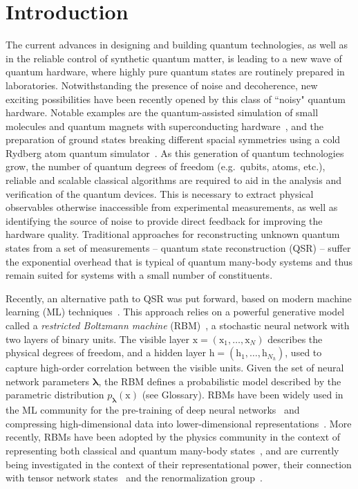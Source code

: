 \documentclass[submission, Phys, hidelnks]{SciPost}
\begin{document}
\section{Introduction}
The current advances in designing and building quantum technologies, as well as in the reliable control of synthetic quantum matter, is leading to a new wave of quantum hardware, where highly pure quantum states are routinely prepared in laboratories. Notwithstanding the presence of noise and decoherence, new exciting possibilities have been recently opened by this class of ``noisy" quantum hardware. Notable examples are the quantum-assisted simulation of small molecules and quantum magnets with superconducting hardware~\cite{gambetta17,gambetta18}, and the preparation of ground states breaking different spacial symmetries using a cold Rydberg atom quantum simulator~\cite{Bernien17}. As this generation of quantum technologies grow, the number of quantum degrees of freedom (e.g.~qubits, atoms, etc.), reliable and scalable classical algorithms are required to aid in the analysis and verification of the quantum devices. This is necessary to extract physical observables otherwise inaccessible from experimental measurements, as well as identifying the source of noise to provide direct feedback for improving the hardware quality. Traditional approaches for reconstructing unknown quantum states from a set of measurements -- quantum state reconstruction (QSR) -- suffer the exponential overhead that is typical of quantum many-body systems and thus remain suited for systems with a small number of constituents. 

Recently, an alternative path to QSR was put forward, based on modern machine learning (ML) techniques~\cite{torlai2018tomography, TorlaiMixed}. This approach relies on a powerful generative model called a {\it restricted Boltzmann machine} (RBM)~\cite{Smolensky}, a stochastic neural network with two layers of binary units. The visible layer $\bm{\mathrm{x}}=(\mathrm{x}_1,\dots,\mathrm{x}_N)$ describes the physical degrees of freedom, and a hidden layer $\bm{\mathrm{h}}=(\mathrm{h}_1,\dots,\mathrm{h}_{N_h})$, used to capture high-order correlation between the visible units. Given the set of neural network parameters $\bm{\lambda}$, the RBM defines a probabilistic model described by the parametric distribution $p_{\bm{\lambda}}(\bm{\mathrm{x}})$ (see Glossary). RBMs have been widely used in the ML community for the pre-training of deep neural networks~\cite{Hinton06} and compressing high-dimensional data into lower-dimensional representations~\cite{Hinton504}. More recently, RBMs have been adopted by the physics community in the context of representing both classical and quantum many-body states~\cite{Torlai2016thermo, CarleoTroyer2017Science}, and are currently being investigated in the context of their representational power, their connection with tensor network states~\cite{GlasserCirac2018} and the renormalization group~\cite{Maciej}.
\end{document}
